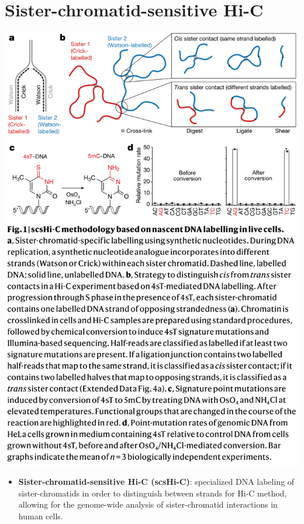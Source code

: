 \documentclass[plain,basic]{inVerba-notes}
\begin{document}
\section{Sister-chromatid-sensitive Hi-C}
\begin{center}
    \includegraphics[scale=0.42]{images/8-1.png}
\end{center}
\begin{itemize}
    \item \textbf{Sister-chromatid-sensitive Hi-C (scsHi-C)}: specialized DNA labeling of sister-chromatids in order to distinguish between strands for Hi-C method, allowing for the genome-wide analysis of sister-chromatid interactions in human cells.
\end{itemize}
\end{document}
